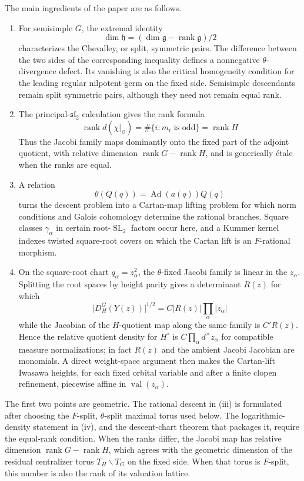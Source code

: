 \documentclass[11pt]{amsart}
\theoremstyle{definition}
\theoremstyle{remark}
\newcommand{\cQ}{\mathcal Q}
\newcommand{\Ad}{\operatorname{Ad}}
\newcommand{\rank}{\operatorname{rank}}
\newcommand{\SL}{\operatorname{SL}}
\newcommand{\val}{\operatorname{val}}
\newcommand{\abs}[1]{\lvert #1\rvert}
\newcommand{\g}{\mathfrak g}
\newcommand{\h}{\mathfrak h}
\newcommand{\slie}{\mathfrak{sl}}
\begin{document}
The main ingredients of the paper are as follows.
\begin{enumerate}[label=\textup{(\roman*)},leftmargin=2.5em]
\item For semisimple $G$, the extremal identity
      \[
       \dim\h=(\dim\g-\rank\g)/2
\]
      characterizes the Chevalley, or split, symmetric pairs.  The difference
      between the two sides of the corresponding inequality defines a nonnegative
      $\theta$-divergence defect.  Its vanishing is also the critical homogeneity
      condition for the leading regular nilpotent germ on the fixed side.
      Semisimple descendants remain split symmetric pairs, although they need not
      remain equal rank.
\item The principal-$\slie_2$ calculation gives the rank formula
      \[
       \rank d(\chi|_{\cQ})=\#\{i:m_i\text{ is odd}\}=\rank H
\]
      Thus the Jacobi family maps dominantly onto the fixed part of the
      adjoint quotient, with relative dimension $\rank G-\rank H$, and is
      generically \'etale when the ranks are equal.
\item A relation
      \[
       \theta(Q(q))=\Ad(a(q))Q(q)
\]
      turns the descent problem into a Cartan-map lifting problem for which
      norm conditions and Galois cohomology determine the rational branches.
      Square classes $\gamma_\alpha$ in certain root-$\SL_2$ factors occur here, 
      and a Kummer kernel indexes twisted square-root
      covers on which the Cartan lift is an $F$-rational morphism.
\item On the square-root chart $q_\alpha=z_\alpha^2$, the $\theta$-fixed Jacobi
      family is linear in the $z_\alpha$.  Splitting the root spaces by
      height parity gives a determinant $R(z)$ for which
      \[
       \abs{D_H^G(Y(z))}^{1/2}
       =C\abs{R(z)}\prod_\alpha\abs{z_\alpha}
\]
      while the Jacobian of the $H$-quotient map along the same family is
      $C'R(z)$.  Hence the relative quotient density for $H^\circ$ is
      $C\prod_\alpha d^\times z_\alpha$ for compatible measure normalizations;
      in fact $R(z)$ and the ambient
      Jacobi Jacobian are monomials.  A direct weight-space argument then makes
      the Cartan-lift Iwasawa heights, for each fixed orbital variable and after
      a finite clopen refinement, piecewise affine in $\val(z_\alpha)$.
\end{enumerate}

The first two points are geometric.  The rational descent in \textup{(iii)} is
formulated after choosing the $F$-split, $\theta$-split maximal torus used
below.  The logarithmic-density statement in \textup{(iv)}, and the
descent-chart theorem that packages it, require the equal-rank condition.
When the ranks differ, the Jacobi map has relative dimension
$\rank G-\rank H$, which agrees with the geometric dimension of the residual
centralizer torus $T_H\backslash T_G$ on the fixed side.  When that torus is
$F$-split, this number is also the rank of its valuation lattice.
\end{document}
